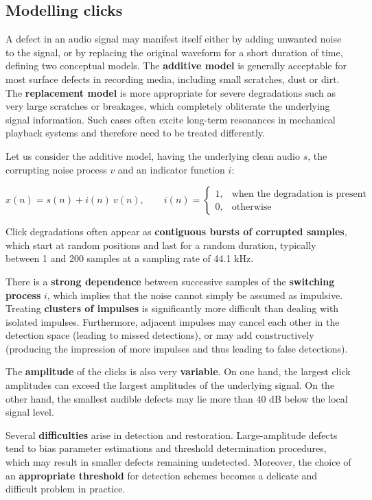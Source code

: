 \subsection{Modelling clicks}
A defect in an audio signal may manifest itself either by adding unwanted noise to the signal, or by replacing the original waveform for a short duration of time, defining two conceptual models.
The \textbf{additive model} is generally acceptable for most surface defects in recording media, including small scratches, dust or dirt.
The \textbf{replacement model} is more appropriate for severe degradations such as very large scratches or breakages, which completely obliterate the underlying signal information.
Such cases often excite long-term resonances in mechanical playback systems and therefore need to be treated differently.

Let us consider the additive model, having the underlying clean audio $s$, the corrupting noise process $v$ and an indicator function $i$:

\[
x(n) = s(n) + i(n)\ v(n),
\qquad
i(n) =
\begin{cases}
    1, & \text{when the degradation is present} \\
    0, & \text{otherwise}
\end{cases}
\]

Click degradations often appear as \textbf{contiguous bursts of corrupted samples}, which start at random positions and last for a random duration, typically between 1 and 200 samples at a sampling rate of 44.1 kHz.

There is a \textbf{strong dependence} between successive samples of the \textbf{switching process} $i$, which implies that the noise cannot simply be assumed as impulsive.
Treating \textbf{clusters of impulses} is significantly more difficult than dealing with isolated impulses.
Furthermore, adjacent impulses may cancel each other in the detection space (leading to missed detections), or may add constructively (producing the impression of more impulses and thus leading to false detections).  

The \textbf{amplitude} of the clicks is also very \textbf{variable}.
On one hand, the largest click amplitudes can exceed the largest amplitudes of the underlying signal.
On the other hand, the smallest audible defects may lie more than 40 dB below the local signal level.  

Several \textbf{difficulties} arise in detection and restoration.
Large-amplitude defects tend to bias parameter estimations and threshold determination procedures, which may result in smaller defects remaining undetected.
Moreover, the choice of an \textbf{appropriate threshold} for detection schemes becomes a delicate and difficult problem in practice.

